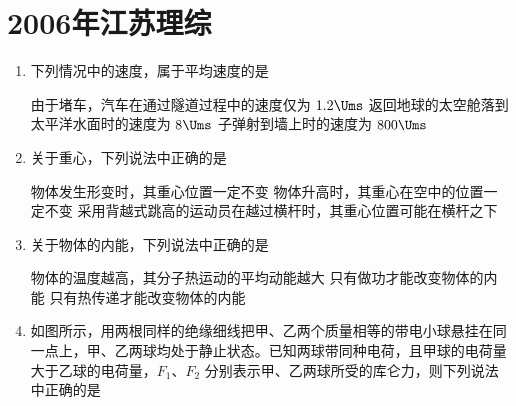 \documentclass[\gkver]{gaokaozhenti}
\begin{document}
\chapter{2006年江苏理综}

\begin{enumerate}
\item
下列情况中的速度，属于平均速度的是

{由于堵车，汽车在通过隧道过程中的速度仅为 $1.2\Ums$}
{返回地球的太空舱落到太平洋水面时的速度为 $8\Ums$}
{子弹射到墙上时的速度为 $800\Ums$}


\item
关于重心，下列说法中正确的是

{物体发生形变时，其重心位置一定不变}
{物体升高时，其重心在空中的位置一定不变}
{采用背越式跳高的运动员在越过横杆时，其重心位置可能在横杆之下}


\item
关于物体的内能，下列说法中正确的是

{物体的温度越高，其分子热运动的平均动能越大}
{只有做功才能改变物体的内能}
{只有热传递才能改变物体的内能}


\item
如图所示，用两根同样的绝缘细线把甲、乙两个质量相等的带电小球悬挂在同一点上，甲、乙两球均处于静止状态。已知两球带同种电荷，且甲球的电荷量大于乙球的电荷量，$F_{1}$、$F_{2}$ 分别表示甲、乙两球所受的库仑力，则下列说法中正确的是


\end{enumerate}
\end{document}
